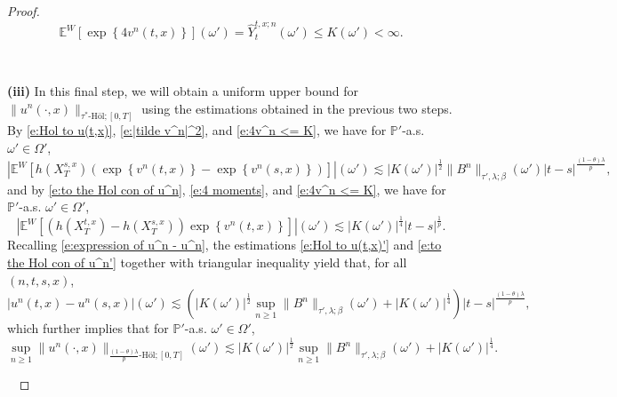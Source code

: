 \documentclass[11pt,reqno]{amsart}
\def\E{\mathbb E}
\numberwithin{equation}{section}
\begin{document}
\begin{proof}
\begin{equation}\label{e:4v^n <= K}
\mathbb{E}^{W}\left[\exp\left\{4v^{n}(t,x)\right\}\right](\omega') = \hat{Y}^{t,x;n}_{t}(\omega') \le  K(\omega')<\infty. 
\end{equation}

\ 

{\bf (iii)} In this final step, we will  obtain a uniform upper bound for $\|u^{n}(\cdot,x)\|_{\tau^*\text{-H\"ol};[0,T]}$ using the estimations obtained in the previous two steps.  By \eqref{e:Hol to u(t,x)}, \eqref{e:|tilde v^n|^2}, and \eqref{e:4v^n <= K}, we have for $\mathbb{P}'$-a.s. $\omega'\in\Omega'$, 
\begin{equation}\label{e:Hol to u(t,x)'}
\left| \E^{W}\left[ h(X^{s,x}_{T})\left(\exp\left\{v^{n}(t,x)\right\} - \exp\left\{v^{n}(s,x)\right\}\right) \right] \right|(\omega') \lesssim |K(\omega')|^{\frac{1}{2}} \|B^{n}\|_{\tau',\lambda;\beta}(\omega') |t - s|^{\frac{(1-\theta)\lambda}{p}},
\end{equation}
and by \eqref{e:to the Hol con of u^n}, \eqref{e:4 moments}, and \eqref{e:4v^n <= K}, we have for $\mathbb{P}'$-a.s. $\omega'\in\Omega'$, 
\begin{equation}\label{e:to the Hol con of u^n'}
\left|\E^{W}\left[\left(h(X^{t,x}_{T}) - h(X^{s,x}_{T})\right)\exp\left\{v^{n}(t,x)\right\}\right]\right|(\omega') \lesssim |K(\omega')|^{\frac{1}{4}} |t - s|^{\frac{1}{p}}.
\end{equation}
Recalling \eqref{e:expression of u^n - u^n}, the estimations \eqref{e:Hol to u(t,x)'} and \eqref{e:to the Hol con of u^n'} together with triangular inequality yield that,  for all $(n,t,s,x)$,
\begin{equation*}
\left|u^{n}(t,x) - u^{n}(s,x)\right|(\omega')\lesssim \left(\left|K(\omega')\right|^{\frac{1}{2}}\sup_{n\ge 1}\|B^n\|_{\tau',\lambda;\beta}(\omega') + \left|K(\omega')\right|^{\frac{1}{4}} \right)|t-s|^{\frac{(1-\theta)\lambda}{p}},
\end{equation*}
which further implies that for $\mathbb{P}'$-a.s. $\omega'\in\Omega'$,
\begin{equation}\label{e:uniform Hol of u^n}
\sup_{n\ge 1}\|u^{n}(\cdot,x)\|_{\frac{(1-\theta)\lambda}{p}\text{-H\"ol};[0,T]}(\omega') \lesssim \left|K(\omega')\right|^{\frac{1}{2}}\sup_{n\ge 1}\|B^n\|_{\tau',\lambda;\beta}(\omega') + \left|K(\omega')\right|^{\frac{1}{4}}.
\end{equation}

\ 


\end{proof}
\end{document}
